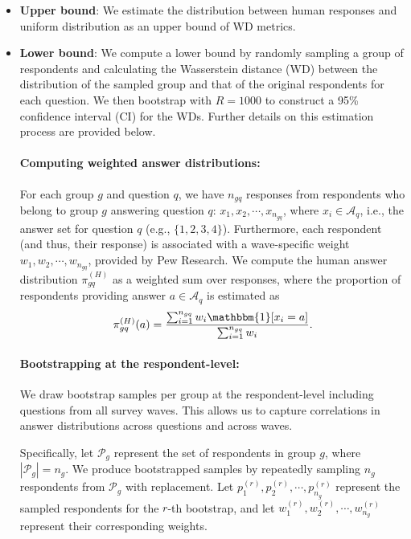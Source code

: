 \begin{itemize}[leftmargin=*]
    \item \textbf{Upper bound}:
    We estimate the distribution between human responses and uniform distribution as an upper bound of WD metrics.
    
    \item \textbf{Lower bound}: We compute a lower bound by randomly sampling a group of respondents and calculating the Wasserstein distance (WD) between the distribution of the sampled group and that of the original respondents for each question. We then bootstrap with $R = 1000$ to construct a 95\% confidence interval (CI) for the WDs. Further details on this estimation process are provided below.

    \paragraph{Computing weighted answer distributions:}
    For each group $g$ and question $q$, we have $n_{gq}$ responses from respondents who belong to group $g$ answering question $q$: $x_1, x_2, \cdots, x_{n_{gq}}$, where $x_i \in \mathcal{A}_q$, i.e., the answer set for question $q$ (e.g., $\{1, 2, 3, 4\}$). 
    Furthermore, each respondent (and thus, their response) is associated with a wave-specific weight $w_1, w_2, \cdots, w_{n_{gq}}$, provided by Pew Research.
    We compute the human answer distribution $\pi_{gq}^{(H)}$ as a weighted sum over responses, where the proportion of respondents providing answer $a \in \mathcal{A}_q$ is estimated as
    \begin{align*}
        \pi_{gq}^{(H)}(a) = \frac{\sum_{i=1}^{n_{gq}} w_i \mathbbm{1}[x_i = a]}{\sum_{i=1}^{n_{gq}} w_i}. \label{eqn:human-weighted-dist}
    \end{align*}


    \paragraph{Bootstrapping at the respondent-level:}
    We draw bootstrap samples per group at the respondent-level including questions from all survey waves.
    This allows us to capture correlations in answer distributions across questions and across waves.
    
    Specifically, let $\mathcal{P}_{g}$ represent the set of respondents in group $g$, where $|\mathcal{P}_{g}| = n_{g}$.
    We produce bootstrapped samples by repeatedly sampling $n_{g}$ respondents from $\mathcal{P}_{g}$ with replacement.
    Let $p_1^{(r)}, p_2^{(r)}, \cdots, p_{n_{g}}^{(r)}$ represent the sampled respondents for the $r$-th bootstrap, and let $w_{1}^{(r)}, w_{2}^{(r)}, \cdots, w_{n_{g}}^{(r)}$ represent their corresponding weights.
    

\end{itemize}
